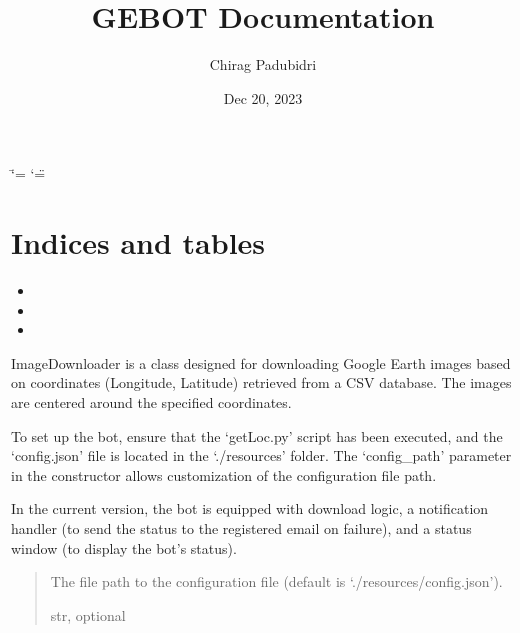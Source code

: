 \documentclass[letterpaper,10pt,english]{sphinxmanual}
\title{GEBOT Documentation}
\date{Dec 20, 2023}
\author{Chirag Padubidri}
\begin{document}
\ifdefined\shorthandoff
  \ifnum\catcode`\=\string=\active\shorthandoff{=}\fi
  \ifnum\catcode`\"=\active{}\fi
\fi

\pagestyle{empty}
\sphinxmaketitle
\pagestyle{plain}
\sphinxtableofcontents
\pagestyle{normal}
\label{\detokenize{index::doc}}



\chapter{Indices and tables}
\label{\detokenize{index:indices-and-tables}}\begin{itemize}
\item {} 
\sphinxAtStartPar
{}

\item {} 
\sphinxAtStartPar
{}

\item {} 
\sphinxAtStartPar
{}

\end{itemize}
\label{\detokenize{index:module-gebot.ImageDownloader}}
\sphinxAtStartPar
{}

\sphinxAtStartPar
ImageDownloader is a class designed for downloading Google Earth images based on coordinates (Longitude, Latitude) retrieved from a CSV database. The images are centered around the specified coordinates.

\sphinxAtStartPar
To set up the bot, ensure that the ‘getLoc.py’ script has been executed, and the ‘config.json’ file is located in the ‘./resources’ folder. The ‘config\_path’ parameter in the constructor allows customization of the configuration file path.

\sphinxAtStartPar
In the current version, the bot is equipped with download logic, a notification handler (to send the status to the registered email on failure), and a status window (to display the bot’s status).
\begin{quote}\begin{description}
\sphinxAtStartPar
The file path to the configuration file (default is ‘./resources/config.json’).

\sphinxAtStartPar
str, optional

\end{description}\end{quote}
\end{document}

